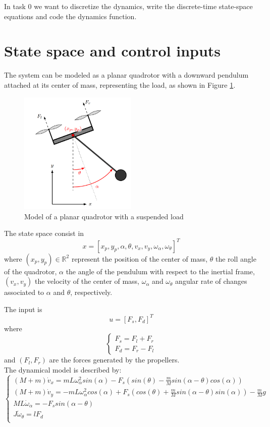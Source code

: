 In task 0 we want to discretize the dynamics, write the discrete-time state-space equations and code the
dynamics function.

\section{State space and control inputs}
The system can be modeled as a planar quadrotor with a downward pendulum attached
at its center of mass, representing the load,
as shown in Figure \ref{fig:quadrotor}.

\begin{figure}[htp]
\centering
\includegraphics[width=0.5\textwidth]{pictures/quadrotor}
\caption{Model of a planar quadrotor with a suspended load}
\label{fig:quadrotor}
\end{figure}

The state space consist in \[ x = [x_p, y_p, \alpha, \theta, v_x, v_y, \omega_\alpha, \omega_\theta]^T\] where $(x_p, y_p) \in \mathbb{R}^2$ represent the position of the center of mass, $\theta$ the roll angle of the quadrotor, $\alpha$ the angle of the pendulum with respect to the inertial frame, $(v_x, v_y)$ the velocity of the center of mass, $\omega_\alpha$ and $\omega_\theta$ angular rate of changes associated to $\alpha$ and $\theta$, respectively.

The input is \[u = [F_s, F_d]^T\] where \[\begin{cases}F_s = F_l + F_r \\ F_d = F_r - F_l\end{cases}\] and $(F_l, F_r)$ are the forces generated by the propellers.
\\



The dynamical model is described by:
\[
\begin{cases}
(M+m) \dot{v}_x  = m L \omega_\alpha^2 sin(\alpha) - F_s (sin(\theta) - \frac{m}{M} sin(\alpha - \theta) cos(\alpha))\\
(M+m) \dot{v}_y  = - m L \omega_\alpha^2 cos(\alpha) + F_s (cos(\theta) + \frac{m}{M} sin(\alpha - \theta) sin(\alpha)) - \frac{m}{M} g\\
M L \dot{\omega}_\alpha = - F_s sin(\alpha - \theta)\\
J \dot{\omega}_\theta = l F_d\\
\end{cases}
\]

